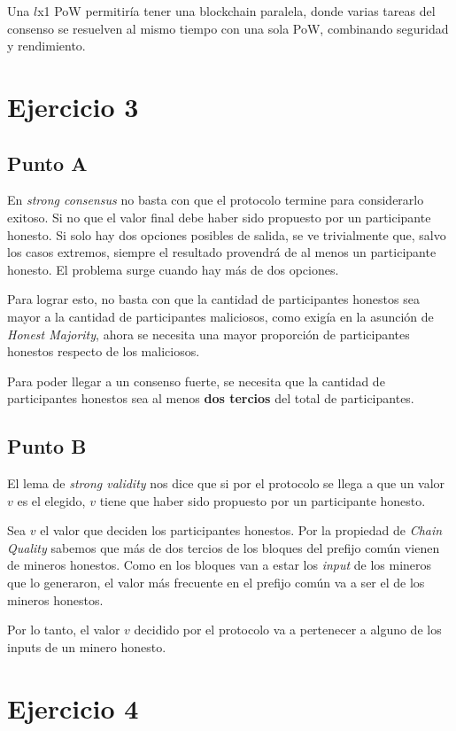 \documentclass[12pt]{article}
\begin{document}
Una $l$x1 PoW permitiría tener una blockchain paralela, donde varias tareas del consenso se resuelven al mismo tiempo con una sola PoW, combinando seguridad y rendimiento.

\section{Ejercicio 3}

\subsection{Punto A}

En \emph{strong consensus} no basta con que el protocolo termine para considerarlo exitoso. Si no que el valor final debe haber sido propuesto por un participante honesto.  
Si solo hay dos opciones posibles de salida, se ve trivialmente que, salvo los casos extremos, siempre el resultado provendrá de al menos un participante honesto.  
El problema surge cuando hay más de dos opciones.

Para lograr esto, no basta con que la cantidad de participantes honestos sea mayor a la cantidad de participantes maliciosos, como exigía en la asunción de \emph{Honest Majority}, ahora se necesita una mayor proporción de participantes honestos respecto de los maliciosos.

Para poder llegar a un consenso fuerte, se necesita que la cantidad de participantes honestos sea al menos \textbf{dos tercios} del total de participantes.

\subsection{Punto B}

El lema de \emph{strong validity} nos dice que si por el protocolo se llega a que un valor $v$ es el elegido, $v$ tiene que haber sido propuesto por un participante honesto.  

Sea $v$ el valor que deciden los participantes honestos. Por la propiedad de \emph{Chain Quality} sabemos que más de dos tercios de los bloques del prefijo común vienen de mineros honestos.  
Como en los bloques van a estar los \emph{input} de los mineros que lo generaron, el valor más frecuente en el prefijo común va a ser el de los mineros honestos.

Por lo tanto, el valor $v$ decidido por el protocolo va a pertenecer a alguno de los inputs de un minero honesto.

\section{Ejercicio 4}
\end{document}
